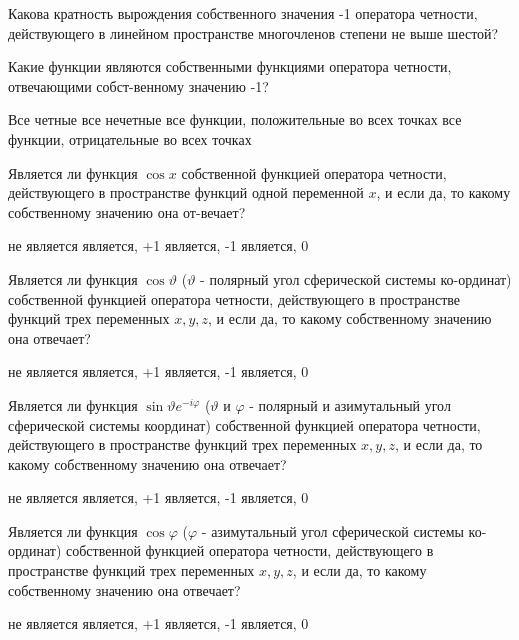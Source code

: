 \documentclass[11pt,a4paper]{exam}
\begin{document}
\begin{questions}
\question Какова кратность вырождения собственного значения -1 оператора четности, действующего в линейном пространстве многочленов степени не выше шестой?
\begin{choices}
\end{choices}

\question Какие функции являются собственными функциями оператора четности, отвечающими собст-венному значению -1?
\begin{choices}
\choice Все четные
\choice все нечетные 
\choice все функции, положительные во всех точках
\choice все функции, отрицательные во всех точках
\end{choices}

\question Является ли функция $\cos x$ собственной функцией оператора четности, действующего в пространстве функций одной переменной $x$, и если да, то какому собственному значению она от-вечает?
\begin{choices}
\choice не является  
\choice является, +1 
\choice является, -1 
\choice является, 0
\end{choices}

\question Является ли функция $\cos \vartheta $ ($\vartheta $ - полярный угол сферической системы ко-ординат) собственной функцией оператора четности, действующего в пространстве функций трех переменных $x,y,z$, и если да, то какому собственному значению она отвечает?
\begin{choices}
\choice не является  
\choice является, +1 
\choice является, -1 
\choice является, 0
\end{choices}

\question Является ли функция $\sin \vartheta {{e}^{-i\varphi }}$ ($\vartheta $ и $\varphi $ - полярный и азимутальный угол сферической системы координат) собственной функцией оператора четности, действующего в пространстве функций трех переменных $x,y,z$, и если да, то какому собственному значению она отвечает?
\begin{choices}
\choice не является  
\choice является, +1 
\choice является, -1 
\choice является, 0
\end{choices}

\question Является ли функция $\cos \varphi $ ($\varphi $ - азимутальный угол сферической системы ко-ординат) собственной функцией оператора четности, действующего в пространстве функций трех переменных $x,y,z$, и если да, то какому собственному значению она отвечает?
\begin{choices}
\choice не является  
\choice является, +1 
\choice является, -1 
\choice является, 0
\end{choices}


\end{questions}
\end{document}
